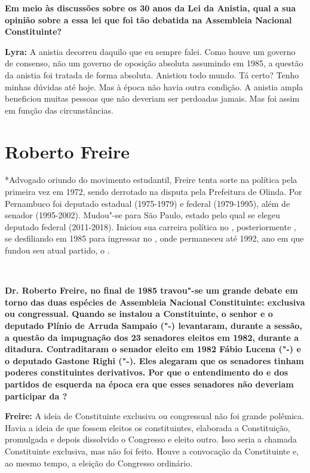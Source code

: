 \textbf{Em meio às discussões sobre os 30 anos da Lei da Anistia, qual a
sua opinião sobre a essa lei que foi tão debatida na Assembleia Nacional
Constituinte?}

\textbf{Lyra:} A anistia decorreu daquilo que eu sempre falei. Como
houve um governo de consenso, não um governo de oposição absoluta
assumindo em 1985, a questão da anistia foi tratada de forma absoluta.
Anistiou todo mundo. Tá certo? Tenho minhas dúvidas até hoje. Mas à
época não havia outra condição. A anistia ampla beneficiou muitas
pessoas que não deveriam ser perdoadas jamais. Mas foi assim em função
das circunstâncias.

\chapter{Roberto Freire}

*Advogado oriundo do movimento estudantil, Freire tenta sorte na
política pela primeira vez em 1972, sendo derrotado na disputa pela
Prefeitura de Olinda. Por Pernambuco foi deputado estadual (1975-1979) e
federal (1979-1995), além de senador (1995-2002). Mudou"-se para São
Paulo, estado pelo qual se elegeu deputado federal (2011-2018). Iniciou
sua carreira política no , posteriormente , se desfiliando em
1985 para ingressar no , onde permaneceu até 1992, ano em que fundou
seu atual partido, o .

​

\textbf{Dr. Roberto Freire, no final de 1985 travou"-se um grande debate
em torno das duas espécies de Assembleia Nacional Constituinte:
exclusiva ou congressual. Quando se instalou a Constituinte, o senhor e
o deputado Plínio de Arruda Sampaio ("-) levantaram, durante a
sessão, a questão da impugnação dos 23 senadores eleitos em 1982,
durante a ditadura. Contraditaram o senador eleito em 1982 Fábio Lucena
("-) e o deputado Gastone Righi ("-). Eles alegaram que os
senadores tinham poderes constituintes derivativos. Por que o
entendimento do  e dos partidos de esquerda na época era que esses
senadores não deveriam participar da ?}

\textbf{Freire:} A ideia de Constituinte exclusiva ou congressual não
foi grande polêmica. Havia a ideia de que fossem eleitos os
constituintes, elaborada a Constituição, promulgada e depois dissolvido
o Congresso e eleito outro. Isso seria a chamada Constituinte exclusiva,
mas não foi feito. Houve a convocação da Constituinte e, ao mesmo tempo,
a eleição do Congresso ordinário.

